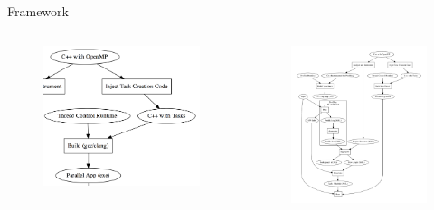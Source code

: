 \documentclass[xcolor=dvipsnames]{beamer}
\begin{document}
\begin{section}{Framework}
\begin{frame}{\hskip 0.3cm }
\begin{columns}
\begin{column}{6.5cm}
\vskip -1.7cm

\begin{figure}
\hskip -0.7cm
\includegraphics[scale=0.21]{zoom3.png}
\end{figure}

\end{column}
\begin{column}{4cm}
\vskip -1.5cm
\begin{figure}
\hskip -0.5cm
\includegraphics[scale=0.15]{framework.pdf}
\end{figure}


\end{column}
\end{columns}
\end{frame}
\end{section}
\end{document}
